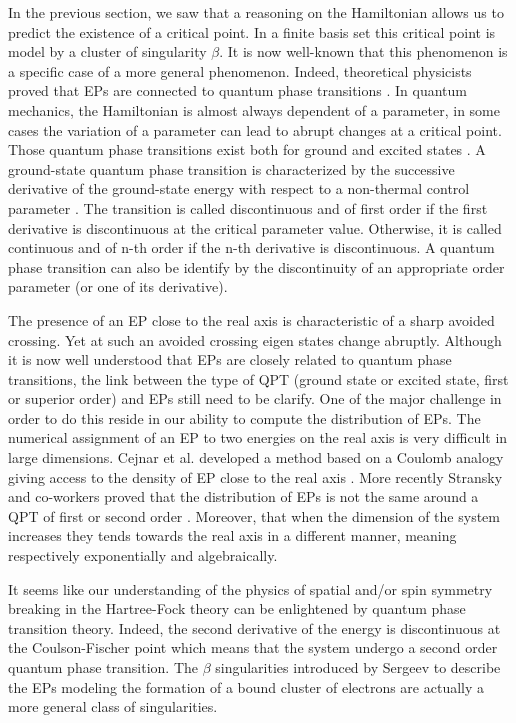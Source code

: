 \documentclass[11pt,a4paper]{article}
\begin{document}
In the previous section, we saw that a reasoning on the Hamiltonian allows us to predict the existence of a critical point. In a finite basis set this critical point is model by a cluster of singularity $\beta$. It is now well-known that this phenomenon is a specific case of a more general phenomenon. Indeed, theoretical physicists proved that EPs are connected to quantum phase transitions \cite{Heiss_1988, Heiss_2002, Cejnar_2005, Cejnar_2007, Cejnar_2009, Borisov_2015, Sindelka_2017}. In quantum mechanics, the Hamiltonian is almost always dependent of a parameter, in some cases the variation of a parameter can lead to abrupt changes at a critical point. Those quantum phase transitions exist both for ground and excited states \cite{Cejnar_2009, Sachdev_2011, Cejnar_2015, Cejnar_2016, Caprio_2008, Macek_2019}. A ground-state quantum phase transition is characterized by the successive derivative of the ground-state energy with respect to a non-thermal control parameter \cite{Cejnar_2009, Sachdev_2011}. The transition is called discontinuous and of first order if the first derivative is discontinuous at the critical parameter value. Otherwise, it is called continuous and of n-th order if the n-th derivative is discontinuous. A quantum phase transition can also be identify by the discontinuity of an appropriate order parameter (or one of its derivative). 

The presence of an EP close to the real axis is characteristic of a sharp avoided crossing. Yet at such an avoided crossing eigen states change abruptly. Although it is now well understood that EPs are closely related to quantum phase transitions, the link between the type of QPT (ground state or excited state, first or superior order) and EPs still need to be clarify. One of the major challenge in order to do this reside in our ability to compute the distribution of EPs. The numerical assignment of an EP to two energies on the real axis is very difficult in large dimensions. Cejnar et al. developed a method based on a Coulomb analogy giving access to the density of EP close to the real axis \cite{Cejnar_2005, Cejnar_2007}. More recently Stransky and co-workers proved that the distribution of EPs is not the same around a QPT of first or second order \cite{Stransky_2018}. Moreover, that when the dimension of the system increases they tends towards the real axis in a different manner, meaning respectively exponentially and algebraically.

It seems like our understanding of the physics of spatial and/or spin symmetry breaking in the Hartree-Fock theory can be enlightened by quantum phase transition theory. Indeed, the second derivative of the energy is discontinuous at the Coulson-Fischer point which means that the system undergo a second order quantum phase transition. The $\beta$ singularities introduced by Sergeev to describe the EPs modeling the formation of a bound cluster of electrons are actually a more general class of singularities.
\end{document}
